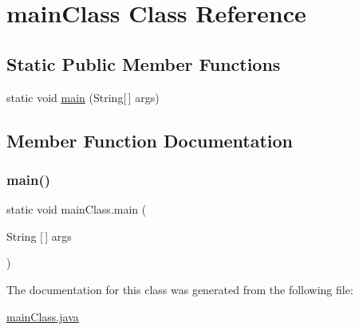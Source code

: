 \hypertarget{classmain_class}{}\section{main\+Class Class Reference}
\label{classmain_class}
\subsection*{Static Public Member Functions}
\begin{DoxyCompactItemize}
\item 
static void \hyperlink{classmain_class_a0b4ecc5e71b50c684de72b0b691a14d0}{main} (String\mbox{[}$\,$\mbox{]} args)
\end{DoxyCompactItemize}


\subsection{Member Function Documentation}
\hypertarget{classmain_class_a0b4ecc5e71b50c684de72b0b691a14d0}{}\label{classmain_class_a0b4ecc5e71b50c684de72b0b691a14d0} 
\subsubsection{\texorpdfstring{main()}{main()}}
{\footnotesize\ttfamily static void main\+Class.\+main (\begin{DoxyParamCaption}\item[{String \mbox{[}$\,$\mbox{]}}]{args }\end{DoxyParamCaption})\hspace{0.3cm}{\ttfamily [static]}}



The documentation for this class was generated from the following file\+:\begin{DoxyCompactItemize}
\item 
\hyperlink{main_class_8java}{main\+Class.\+java}\end{DoxyCompactItemize}
